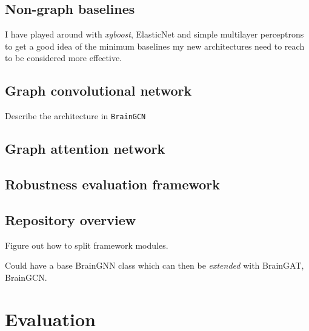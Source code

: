 \documentclass[12pt,a4paper,twoside, openright, hidelinks]{report}
\begin{document}
\section{Non-graph baselines}
I have played around with \textit{xgboost}, ElasticNet and simple multilayer perceptrons to get a good idea of the minimum baselines my new architectures need to reach to be considered more effective.

\section{Graph convolutional network}
Describe the architecture in \texttt{BrainGCN}

\section{Graph attention network}

\section{Robustness evaluation framework}

\section{Repository overview}
Figure out how to split framework modules.

Could have a base BrainGNN class which can then be \textit{extended} with BrainGAT, BrainGCN.

\chapter{Evaluation}
\end{document}
